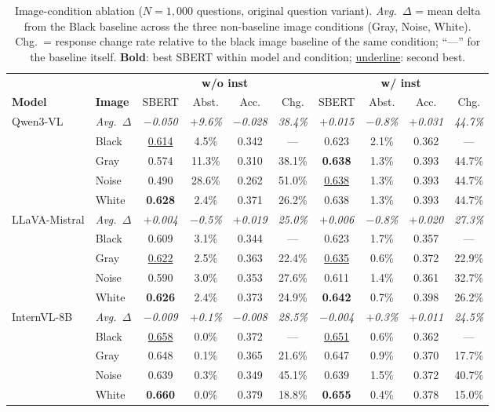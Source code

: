 \begin{table}[t]
\centering
\small
\setlength{\tabcolsep}{4pt}
\begin{tabular}{ll cccc cccc}
\toprule
 & & \multicolumn{4}{c}{\textbf{w/o inst}} & \multicolumn{4}{c}{\textbf{w/ inst}} \\
\cmidrule(lr){3-6}\cmidrule(lr){7-10}
\textbf{Model} & \textbf{Image} & SBERT & Abst. & Acc. & Chg. & SBERT & Abst. & Acc. & Chg. \\
\midrule
\multirow{5}{*}{Qwen3-VL}
 & \textit{Avg.\ $\Delta$} & \textit{$-$0.050} & \textit{$+$9.6\%} & \textit{$-$0.028} & \textit{38.4\%} & \textit{$+$0.015} & \textit{$-$0.8\%} & \textit{$+$0.031} & \textit{44.7\%} \\
 & Black & \underline{0.614} & 4.5\% & 0.342 & --- & 0.623 & 2.1\% & 0.362 & --- \\
 & Gray & 0.574 & 11.3\% & 0.310 & 38.1\% & \textbf{0.638} & 1.3\% & 0.393 & 44.7\% \\
 & Noise & 0.490 & 28.6\% & 0.262 & 51.0\% & \underline{0.638} & 1.3\% & 0.393 & 44.7\% \\
 & White & \textbf{0.628} & 2.4\% & 0.371 & 26.2\% & 0.638 & 1.3\% & 0.393 & 44.7\% \\
\midrule
\multirow{5}{*}{LLaVA-Mistral}
 & \textit{Avg.\ $\Delta$} & \textit{$+$0.004} & \textit{$-$0.5\%} & \textit{$+$0.019} & \textit{25.0\%} & \textit{$+$0.006} & \textit{$-$0.8\%} & \textit{$+$0.020} & \textit{27.3\%} \\
 & Black & 0.609 & 3.1\% & 0.344 & --- & 0.623 & 1.7\% & 0.357 & --- \\
 & Gray & \underline{0.622} & 2.5\% & 0.363 & 22.4\% & \underline{0.635} & 0.6\% & 0.372 & 22.9\% \\
 & Noise & 0.590 & 3.0\% & 0.353 & 27.6\% & 0.611 & 1.4\% & 0.361 & 32.7\% \\
 & White & \textbf{0.626} & 2.4\% & 0.373 & 24.9\% & \textbf{0.642} & 0.7\% & 0.398 & 26.2\% \\
\midrule
\multirow{5}{*}{InternVL-8B}
 & \textit{Avg.\ $\Delta$} & \textit{$-$0.009} & \textit{$+$0.1\%} & \textit{$-$0.008} & \textit{28.5\%} & \textit{$-$0.004} & \textit{$+$0.3\%} & \textit{$+$0.011} & \textit{24.5\%} \\
 & Black & \underline{0.658} & 0.0\% & 0.372 & --- & \underline{0.651} & 0.6\% & 0.362 & --- \\
 & Gray & 0.648 & 0.1\% & 0.365 & 21.6\% & 0.647 & 0.9\% & 0.370 & 17.7\% \\
 & Noise & 0.639 & 0.3\% & 0.349 & 45.1\% & 0.639 & 1.5\% & 0.372 & 40.7\% \\
 & White & \textbf{0.660} & 0.0\% & 0.379 & 18.8\% & \textbf{0.655} & 0.4\% & 0.378 & 15.0\% \\
\midrule
\end{tabular}
\caption{Image-condition ablation ($N{=}1{,}000$ questions, original question variant). \textit{Avg.\ $\Delta$} = mean delta from the Black baseline across the three non-baseline image conditions (Gray, Noise, White). Chg.\ = response change rate relative to the black image baseline of the same condition; ``---'' for the baseline itself. \textbf{Bold}: best SBERT within model and condition; \underline{underline}: second best.}
\label{tab:image_ablation_both_conditions}
\end{table}
